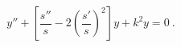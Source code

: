 \begin{equation}
 y''+\left[\frac{s''}{s}-2\left(\frac{s'}{s}\right)^2\right]y+k^2 y= 0~.
 \label{e:y-eqn1}
\end{equation}


